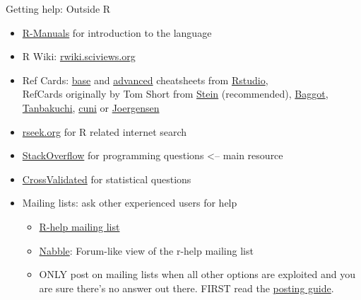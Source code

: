 \documentclass[xcolor=table,           xcolor=dvipsnames]{beamer}\usepackage[]{graphicx}\usepackage[]{color}
\begin{document}
\begin{frame}[fragile]{Getting help: Outside R}
\pause
\begin{itemize}[<+->]
  \item \href{https://cran.r-project.org/manuals.html}{R-Manuals} for introduction to the language
  \item R Wiki: \href{http://rwiki.sciviews.org/}{rwiki.sciviews.org}
  \item Ref Cards:
    \href{https://www.rstudio.com/wp-content/uploads/2016/09/r-cheat-sheet-1.pdf}{base} and
    \href{https://www.rstudio.com/wp-content/uploads/2016/02/advancedR.pdf}{advanced} cheatsheets from
    \href{https://www.rstudio.com/resources/cheatsheets/}{Rstudio},\\
    RefCards originally by Tom Short from
    \href{https://github.com/jonasstein/R-Reference-Card/raw/master/R-refcard.pdf}{Stein} (recommended),
    \href{https://cran.r-project.org/doc/contrib/Baggott-refcard-v2.pdf}{Baggot},
    \href{http://www.u.arizona.edu/~kuchi/Courses/MAT167/Files/R-refcard.pdf}{Tanbakuchi},
    \href{http://atrey.karlin.mff.cuni.cz/~morf/vyuka/pas/materialy/R-refcard.pdf}{cuni} or
    \href{http://statmaster.sdu.dk/bent/courses/ST501-2011/Rcard.pdf}{Joergensen}
	\item \href{www.rseek.org}{rseek.org} for R related internet search
  \item \href{www.StackOverflow.com}{StackOverflow} for programming questions <-- \alert{main resource}
  \item \href{www.CrossValidated.com}{CrossValidated} for statistical questions
	\item Mailing lists: ask other experienced users for help
	\begin{itemize}
  \item \href{http://www.r-project.org/mail.html}{R-help mailing list}
  \item \href{http://r.789695.n4.nabble.com/}{Nabble}: Forum-like view of the r-help mailing list
  \item ONLY post on mailing lists when all other options are exploited and you are sure there's no answer out there. FIRST read the \href{http://www.r-project.org/posting-guide.html}{posting guide}.
\end{itemize}
\end{itemize}
\label{refcards}
\end{frame}

\end{document}
